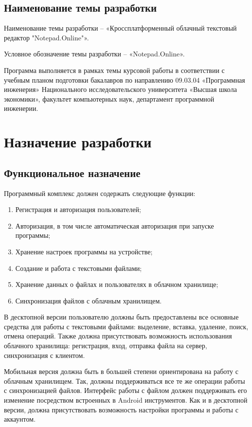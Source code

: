 ﻿\documentclass[techtask]{espd}
\begin{document}
\subsection{Наименование темы разработки}
Наименование темы разработки – «Кроссплатформенный облачный текстовый редактор "Notepad.Online"».

Условное обозначение темы разработки – «Notepad.Online».

Программа выполняется в рамках темы курсовой работы в соответствии с учебным планом подготовки бакалавров по направлению 09.03.04 «Программная инженерия» Национального исследовательского университета «Высшая школа экономики», факультет компьютерных наук, департамент программной инженерии.

\section{Назначение разработки}

\subsection{Функциональное назначение}
Программный комплекс должен содержать следующие функции:

\begin{enumerate}
\item Регистрация и авторизация пользователей;
\item Авторизация, в том числе автоматическая авторизация при запуске программы;
\item Хранение настроек программы на устройстве;
\item Создание и работа с текстовыми файлами;
\item Хранение данных о файлах и пользователях в облачном хранилище;
\item Синхронизация файлов с облачным хранилищем.
\end{enumerate}

В десктопной версии пользователю должны быть предоставлены все основные средства для работы с текстовыми файлами: выделение, вставка, удаление, поиск, отмена операций. Также должна присутствовать возможность использования облачного хранилища: регистрация, вход, отправка файла на сервер, синхронизация с клиентом.

Мобильная версия должна быть в большей степени ориентирована на работу с облачным хранилищем. Так, должны поддерживаться все те же операции работы с синхронизацией файлов. Интерфейс работы с файлом должен поддерживать его изменение посредством встроенных в Android инструментов. Как и в десктопной версии, должна присутствовать возможность настройки программы и работы с аккаунтом.
\end{document}
